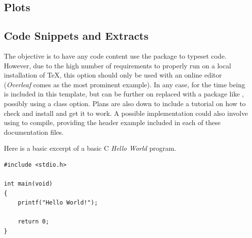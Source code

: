 \documentclass[palatino,english]{ist-report}
\begin{document}
\subsection{Plots}

\subsection{Code Snippets and Extracts}

The objective is to have any code content use the  package to typeset code. However, due to the high number of requirements to properly run  on a local installation of \TeX{}, this option should only be used with an online editor (\textit{Overleaf} comes as the most prominent example). In any case, for the time being  is included in this template, but can be further on replaced with a package like , possibly using a class option. Plans are also down to include a tutorial on how to check and install  and get it to work. A possible implementation could also involve using  to compile, providing the header example included in each of these documentation files.

Here is a basic excerpt of a basic C \textit{Hello World} program.
\begin{verbatim}
#include <stdio.h>

int main(void)
{
    printf("Hello World!");
    
    return 0;
}
\end{verbatim}



\pagebreak

\printbibliography
\end{document}
